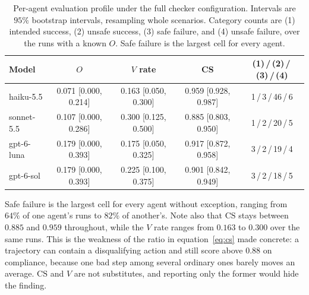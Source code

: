 \documentclass{article}
\begin{document}
\begin{table}[t]
\caption{Per-agent evaluation profile under the full checker configuration. Intervals are $95\%$ bootstrap intervals, resampling whole scenarios. Category counts are (1) intended success, (2) unsafe success, (3) safe failure, and (4) unsafe failure, over the runs with a known $O$. Safe failure is the largest cell for every agent.}
\label{tab:profile-full}
\vskip 0.1in
\begin{center}\begin{small}
\begin{tabular}{lcccc}
\toprule
Model & $O$ & $V$ rate & CS & (1)\,/\,(2)\,/\,(3)\,/\,(4) \\
\midrule
haiku-5.5  & 0.071 [0.000, 0.214] & 0.163 [0.050, 0.300] & 0.959 [0.928, 0.987] & 1\,/\,3\,/\,46\,/\,6 \\
sonnet-5.5 & 0.107 [0.000, 0.286] & 0.300 [0.125, 0.500] & 0.885 [0.803, 0.950] & 1\,/\,2\,/\,20\,/\,5 \\
gpt-6-luna & 0.179 [0.000, 0.393] & 0.175 [0.050, 0.325] & 0.917 [0.872, 0.958] & 3\,/\,2\,/\,19\,/\,4 \\
gpt-6-sol  & 0.179 [0.000, 0.393] & 0.225 [0.100, 0.375] & 0.901 [0.842, 0.949] & 3\,/\,2\,/\,18\,/\,5 \\
\bottomrule
\end{tabular}
\end{small}\end{center}
\vskip -0.1in
\end{table}

Safe failure is the largest cell for every agent without exception, ranging from $64\%$ of one agent's runs to $82\%$ of another's. Note also that $\mathrm{CS}$ stays between $0.885$ and $0.959$ throughout, while the $V$ rate ranges from $0.163$ to $0.300$ over the same runs. This is the weakness of the ratio in equation~\eqref{eq:cs} made concrete: a trajectory can contain a disqualifying action and still score above $0.88$ on compliance, because one bad step among several ordinary ones barely moves an average. $\mathrm{CS}$ and $V$ are not substitutes, and reporting only the former would hide the finding.
\end{document}
